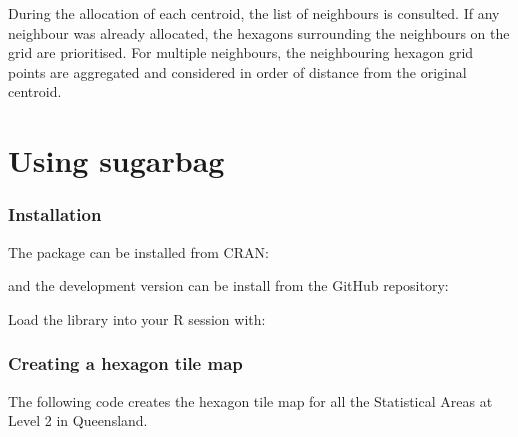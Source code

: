 \documentclass{monashthesis}
\begin{document}
During the allocation of each centroid, the list of neighbours is consulted. If any neighbour was already allocated, the hexagons surrounding the neighbours on the grid are prioritised. For multiple neighbours, the neighbouring hexagon grid points are aggregated and considered in order of distance from the original centroid.

\hypertarget{using-sugarbag}{%
\section{Using sugarbag}\label{using-sugarbag}}

\hypertarget{installation}{%
\subsubsection{Installation}\label{installation}}

The package can be installed from CRAN:

and the development version can be install from the GitHub repository:

Load the library into your R session with:

\hypertarget{creating-a-hexagon-tile-map}{%
\subsubsection{Creating a hexagon tile map}\label{creating-a-hexagon-tile-map}}

The following code creates the hexagon tile map for all the Statistical Areas at Level 2 in Queensland.
\end{document}
